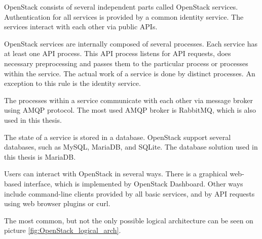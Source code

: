 OpenStack consists of several independent parts called OpenStack services.\cite{CL210} Authentication for all services is provided by a common identity service. The services interact with each other via public APIs. \cite{AdminGuide}

OpenStack services are internally composed of several processes. Each service has at least one API process. This API process listens for API requests, does necessary preprocessing and passes them to the particular process or processes within the service. The actual work of a service is done by distinct processes. An exception to this rule is the identity service.

The processes within a service communicate with each other via message broker using AMQP protocol. The most used AMQP broker is RabbitMQ, which is also used in this thesis.

The state of a service is stored in a database. OpenStack support several databases, such as MySQL, MariaDB, and SQLite. The database solution used in this thesis is MariaDB. \cite{AdminGuide}

Users can interact with OpenStack in several ways. There is a graphical web-based interface, which is implemented by OpenStack Dashboard. Other ways include command-line clients provided by all basic services, and by API requests using web browser plugins or curl.

The most common, but not the only possible logical architecture can be seen on picture \ref{fig:OpenStack_logical_arch}.

